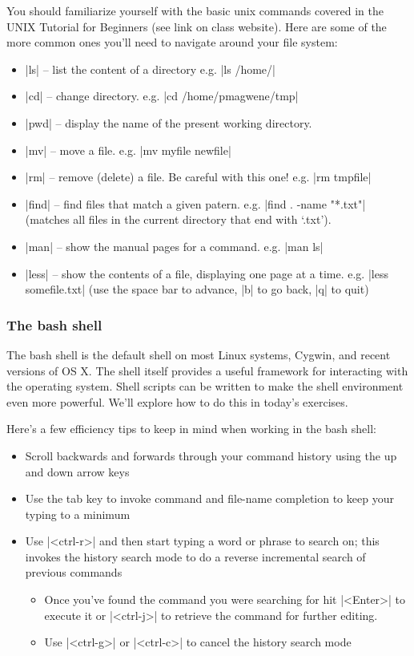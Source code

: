 You should familiarize yourself with the basic unix commands covered in the UNIX Tutorial for Beginners (see link on class website).  Here are some of the more common ones you'll need to navigate around your file system:

\begin{itemize}
\item |ls| -- list the content of a directory e.g. |ls /home/|
\item |cd| -- change directory.  e.g. |cd /home/pmagwene/tmp|
\item |pwd| -- display the name of the present working directory.
\item |mv| -- move a file. e.g. |mv myfile newfile|
\item |rm| -- remove (delete) a file. Be careful with this one! e.g. |rm tmpfile|
\item |find| -- find files that match a given patern. e.g. |find . -name "*.txt"| (matches all files in the current directory that end with `.txt').
\item |man| -- show the manual pages for a command. e.g. |man ls|
\item |less| -- show the contents of a file, displaying one page at a time. e.g. |less somefile.txt| (use the space bar to advance, |b| to go back, |q| to quit)
\end{itemize}


\subsubsection*{The bash shell}

The bash shell is the default shell on most Linux systems, Cygwin, and recent versions of OS X.  The shell itself provides a useful framework for interacting with the operating system. Shell scripts can be written to make the shell environment even more powerful. We'll explore how to do this in today's exercises. 

Here's a few efficiency tips to keep in mind when working in the bash shell:
\begin{itemize}
    \item Scroll backwards and forwards through your command history using the up and down arrow keys
    \item Use the tab key to invoke command and file-name completion to keep your typing to a minimum
    \item Use |<ctrl-r>| and then start typing a word or phrase to search on; this invokes the history search mode to do a reverse incremental search of previous commands
    \begin{itemize}
        \item Once you've found the command you were searching for hit |<Enter>| to execute it or |<ctrl-j>| to retrieve the command for further editing.
        \item Use |<ctrl-g>| or |<ctrl-c>| to cancel the history search mode
    \end{itemize}
\end{itemize}


